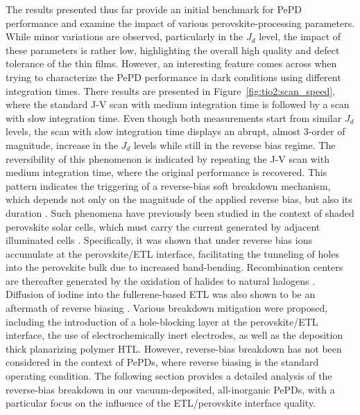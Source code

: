 The results presented thus far provide an initial benchmark for PePD performance and examine the impact of various perovskite-processing parameters. While minor variations are observed, particularly in the $J_d$ level, the impact of these parameters is rather low, highlighting the overall high quality and defect tolerance of the  thin films. However, an interesting feature comes across when trying to characterize the PePD performance in dark conditions using different integration times. There results are presented in Figure~\ref{fig:tio2:scan_speed}, where the standard J-V scan with medium integration time is followed by a scan with slow integration time. Even though both measurements start from similar $J_d$ levels, the scan with slow integration time displays an abrupt, almost 3-order of magnitude, increase in the $J_d$ levels while still in the reverse bias regime. The reversibility of this phenomenon is indicated by repeating the J-V scan with medium integration time, where the original performance is recovered. This pattern indicates the triggering of a reverse-bias soft breakdown mechanism, which depends not only on the magnitude of the applied reverse bias, but also its duration \cite{Bertoluzzi2021IncorporatingBias}. Such phenomena have previously been studied in the context of shaded perovskite solar cells, which must carry the current generated by adjacent illuminated cells \cite{Jiang2024ImprovedElectrodes, Ren2024MobileCells, Li2024BarrierBias,Gould2021In-OperandoBias,Razera2020InstabilityBias,Bertoluzzi2021IncorporatingBias,Wang2023PerovskiteDegradation,Bowring2018ReverseCells, Ni2021EvolutionIllumination}. Specifically, it was shown that under reverse bias ions accumulate at the perovskite/ETL interface, facilitating the tunneling of holes into the perovskite bulk due to increased band-bending. Recombination centers are thereafter generated by the oxidation of halides to natural halogens \cite{Bertoluzzi2021IncorporatingBias}. Diffusion of iodine into the fullerene-based ETL was also shown to be an aftermath of reverse biasing \cite{Razera2020InstabilityBias}. Various breakdown mitigation were proposed, including the introduction of a hole-blocking layer at the perovskite/ETL interface, the use of electrochemically inert electrodes, as well as the deposition thick planarizing polymer HTL. However, reverse-bias breakdown has not been considered in the context of PePDs, where reverse biasing is the standard operating condition. The following section provides a detailed analysis of the reverse-bias breakdown in our vacuum-deposited, all-inorganic PePDs, with a particular focus on the influence of the ETL/perovskite interface quality.


